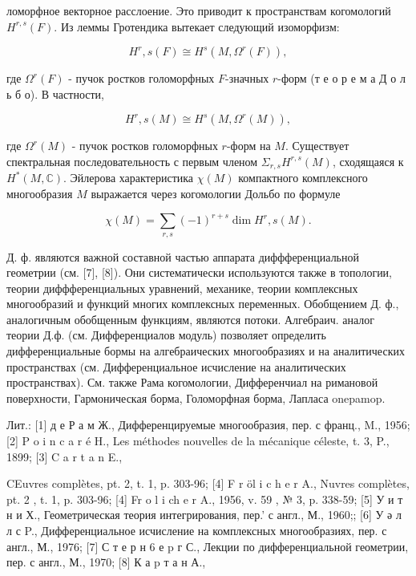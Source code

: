 \documentclass[10pt]{article}
\begin{document}
ломорфное векторное расслоение. Это приводит к пространствам когомологий $H^{r, s}(F)$. Из леммы Гротендика вытекает следующий изоморфизм:



\[

H^{r}, s(F) \cong H^{s}\left(M, \Omega^{r}(F)\right),

\]



где $\Omega^{r}(F)$ - пучок ростков голоморфных $F$-значных $r$-форм (т е о р е м а Д о л ь б о). В частности,



\[

H^{r}, s(M) \cong H^{s}\left(M, \Omega^{r}(M)\right),

\]



где $\Omega^{r}(M)$ - пучок ростков голоморфных $r$-форм на $M$. Существует спектральная последовательность с первым членом $\Sigma_{r, s} H^{r, s}(M)$, сходящаяся к $H^{*}(M, \mathbb{C})$. Эйлерова характеристика $\chi(M)$ компактного комплексного многообразия $M$ выражается через когомологии Дольбо по формуле



\[

\chi(M)=\sum_{r, s}(-1)^{r+s} \operatorname{dim} H^{r}, s(M) .

\]



Д. ф. являются важной составной частью аппарата диффференциальной геометрии (см. [7], [8]). Они систематически используются также в топологии, теории диффференциальных уравнений, механике, теории комплексных многообразий и функций многих комплексных переменных. Обобщением Д. ф., аналогичным обобщенным функциям, являются потоки. Алгебраич. аналог теории Д.ф. (см. Дифференциалов модуль) позволяет определить дифференциальные бормы на алгебраических многообразиях и на аналитических пространствах (см. Дифференциальное исчисление на аналитических пространствах). См. также Рама когомологии, Дифференчиал на римановой поверхности, Гармоническая борма, Голоморфная борма, Лапласа onepamop.



Лит.: [1] д е Р а м Ж., Дифференцируемые многообразия, пер. с франц., M., 1956; [2] P o i n c a r é H., Les méthodes nouvelles de la mécanique céleste, t. 3, P., 1899; [3] C a r t a n E.,

CEuvres complètes, pt. 2, t. 1, p. 303-96; [4] F r öl i c h e r A., Nuvres complètes, pt. 2 , t. 1, p. 303-96; [4] Fr o l i ch e r A., 1956, v. 59 , № 3, p. 338-59; [5] У и т н и Х., Геометрическая теория интегрирования, пер.' с англ., М., 1960;; [6] У ә л л с P., Дифференциальное исчисление на комплексных многообразиях, пер. с англ., М., 1976; [7] С т е р н 6 е p г С., Лекции по дифференциальной геометрии, пер. с англ., М., 1970; [8] К а p т а н А.,
\end{document}
